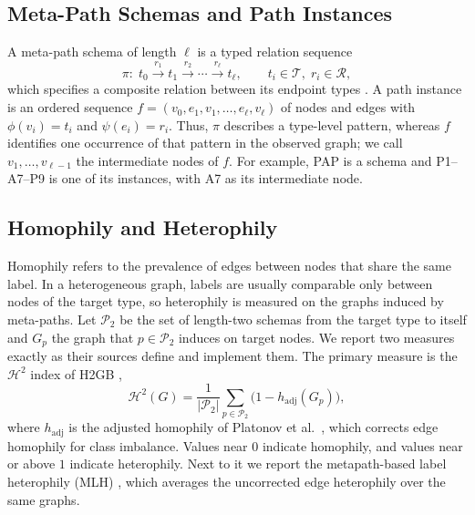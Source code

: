 \documentclass{article}
\begin{document}
\subsection{Meta-Path Schemas and Path Instances}
A meta-path schema of length $\ell$ is a typed relation sequence
\begin{equation}
  \pi:\;
  t_0 \xrightarrow{r_1} t_1 \xrightarrow{r_2}\cdots
  \xrightarrow{r_\ell} t_\ell,
  \qquad t_i\in\mathcal{T},\; r_i\in\mathcal{R},
  \label{eq:schema}
\end{equation}
which specifies a composite relation between its endpoint types \cite{sun2011pathsim}. A path instance is an ordered sequence $f=(v_0,e_1,v_1,\ldots,e_\ell,v_\ell)$ of nodes and edges with $\phi(v_i)=t_i$ and $\psi(e_i)=r_i$. Thus, $\pi$ describes a type-level pattern, whereas $f$ identifies one occurrence of that pattern in the observed graph; we call $v_1,\ldots,v_{\ell-1}$ the intermediate nodes of $f$. For example, PAP is a schema and P1--A7--P9 is one of its instances, with A7 as its intermediate node.

\subsection{Homophily and Heterophily}
Homophily refers to the prevalence of edges between nodes that share the same label. In a heterogeneous graph, labels are usually comparable only between nodes of the target type, so heterophily is measured on the graphs induced by meta-paths. Let $\mathcal{P}_2$ be the set of length-two schemas from the target type to itself and $G_p$ the graph that $p\in\mathcal{P}_2$ induces on target nodes. We report two measures exactly as their sources define and implement them. The primary measure is the $\mathcal{H}^2$ index of H2GB \cite{lin2025heterophily},
\begin{equation}
  \mathcal{H}^2(G)=\frac{1}{|\mathcal{P}_2|}\sum_{p\in\mathcal{P}_2}\bigl(1-h_{\mathrm{adj}}(G_p)\bigr),
  \label{eq:h2}
\end{equation}
where $h_{\mathrm{adj}}$ is the adjusted homophily of Platonov et al.~, which corrects edge homophily for class imbalance. Values near $0$ indicate homophily, and values near or above $1$ indicate heterophily. Next to it we report the metapath-based label heterophily (MLH) \cite{li2025hetero2net}, which averages the uncorrected edge heterophily over the same graphs.
\end{document}
